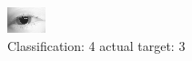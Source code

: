 \begin{figure}[h!]
\begin{center}
\includegraphics[width=0.60\columnwidth]{figures/ID9_class_4_target_3.png}
\end{center}
\caption{ Classification: 4 actual target: 3}
\label{fig:ID9_class_4_target_3}
\end{figure}

